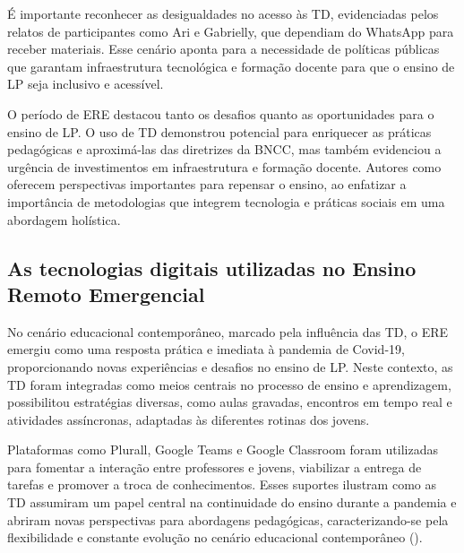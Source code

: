 \documentclass[portuguese]{textolivre}
\begin{document}
É importante reconhecer as desigualdades no acesso às TD, evidenciadas pelos relatos de participantes como Ari e Gabrielly, que dependiam do WhatsApp para receber materiais. Esse cenário aponta para a necessidade de políticas públicas que garantam infraestrutura tecnológica e formação docente para que o ensino de LP seja inclusivo e acessível.

O período de ERE destacou tanto os desafios quanto as oportunidades para o ensino de LP. O uso de TD demonstrou potencial para enriquecer as práticas pedagógicas e aproximá-las das diretrizes da BNCC, mas também evidenciou a urgência de investimentos em infraestrutura e formação docente. Autores como \textcite{soares2002,ribeiro2018} oferecem perspectivas importantes para repensar o ensino, ao enfatizar a importância de metodologias que integrem tecnologia e práticas sociais em uma abordagem holística.

\subsection{As tecnologias digitais utilizadas no Ensino Remoto Emergencial}\label{sec-organizacao-latex}
No cenário educacional contemporâneo, marcado pela influência das TD, o ERE emergiu como uma resposta prática e imediata à pandemia de Covid-19, proporcionando novas experiências e desafios no ensino de LP. Neste contexto, as TD foram integradas como meios centrais no processo de ensino e aprendizagem, possibilitou estratégias diversas, como aulas gravadas, encontros em tempo real e atividades assíncronas, adaptadas às diferentes rotinas dos jovens.

Plataformas como Plurall, Google Teams e Google Classroom foram utilizadas para fomentar a interação entre professores e jovens, viabilizar a entrega de tarefas e promover a troca de conhecimentos. Esses suportes ilustram como as TD assumiram um papel central na continuidade do ensino durante a pandemia e abriram novas perspectivas para abordagens pedagógicas, caracterizando-se pela flexibilidade e constante evolução no cenário educacional contemporâneo ().
\end{document}
